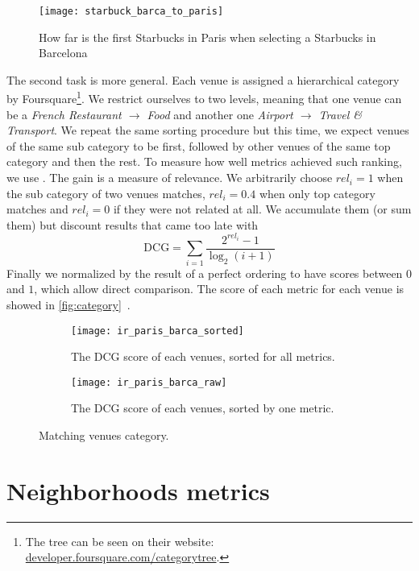 \begin{figure}[h]
        \centering
        \texttt{[image: starbuck\_barca\_to\_paris]}
        \caption{How far is the first Starbucks in Paris when selecting a
        Starbucks in Barcelona}
        \label{fig:brand}
\end{figure}

The second task is more general. Each venue is assigned a hierarchical category
by Foursquare\footnote{The tree can be seen on their website:
\href{https://developer.foursquare.com/categorytree}{%
\url{developer.foursquare.com/categorytree}}.}. We restrict ourselves
to two levels, meaning that one venue can be a \emph{French Restaurant
$\rightarrow$ Food} and another one \emph{Airport $\rightarrow$ Travel
\& Transport}. We repeat the same sorting procedure but this time, we expect
venues of the same sub category to be first, followed by other venues of the
same top category and then the rest. To measure how well metrics achieved such
ranking, we use 
\autocite{IREvaluation07}. The gain is a measure of relevance. We arbitrarily
choose $rel_i=1$ when the sub category of two venues matches, $rel_i=0.4$ when
only top category matches and $rel_i=0$ if they were not related at all. We
accumulate them (or sum them) but discount results that came too late with \[
\mathrm{DCG} = \sum_{i=1} \frac{ 2^{rel_{i}} - 1 }{ \log_{2}(i+1)} \]
Finally we normalized by the result of a perfect ordering to have scores
between $0$ and $1$, which allow direct comparison. The score of each metric
for each venue is showed in \autoref{fig:category}~.

\begin{figure}[h]
    \begin{subfigure}[b]{\textwidth}
        \centering
        \texttt{[image: ir\_paris\_barca\_sorted]}
        \caption{The DCG score of each venues, sorted for all metrics.}
    \end{subfigure}

    \begin{subfigure}[b]{\textwidth}
        \centering
        \texttt{[image: ir\_paris\_barca\_raw]}
        \caption{The DCG score of each venues, sorted by one metric.}
    \end{subfigure}
    \caption{Matching venues category.\label{fig:category}}
\end{figure}

\section{Neighborhoods metrics}

